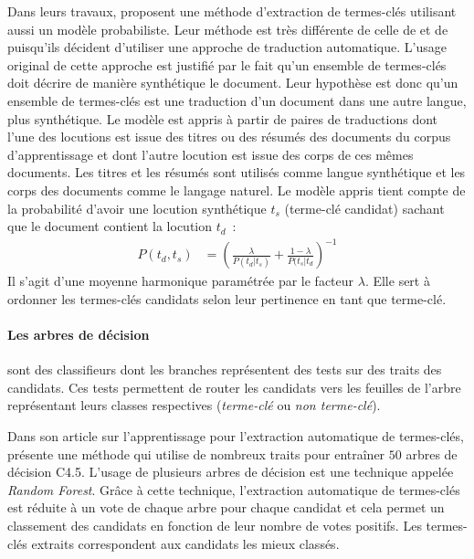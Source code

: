          Dans leurs travaux,  proposent une méthode
          d'extraction de termes-clés utilisant aussi un modèle probabiliste.
          Leur méthode est très différente de celle de  et
          de  puisqu'ils décident d'utiliser une
          approche de traduction automatique. L'usage original de cette approche
          est justifié par le fait qu'un ensemble de termes-clés doit décrire de
          manière synthétique le document. Leur hypothèse est donc qu'un
          ensemble de termes-clés est une traduction d'un document dans une
          autre langue, plus synthétique. Le modèle est appris à partir de
          paires de traductions dont l'une des locutions est issue des titres ou
          des résumés des documents du corpus d'apprentissage et dont l'autre
          locution est issue des corps de ces mêmes documents. Les titres et les
          résumés sont utilisés comme langue synthétique et les corps des
          documents comme le langage naturel. Le modèle appris tient compte de
          la probabilité d'avoir une locution synthétique $t_s$ (terme-clé
          candidat) sachant que le document contient la locution $t_d$~:
            \begin{align}
              P(t_d, t_s) &= \left(\frac{\lambda}{P(t_d | t_s)} + \frac{1 - \lambda}{P(t_s | t_d}\right)^{-1}
            \end{align}
          Il s'agit d'une moyenne harmonique paramétrée par le facteur
          $\lambda$. Elle sert à ordonner les termes-clés candidats selon leur
          pertinence en tant que terme-clé.

        \paragraph{Les arbres de décision}
          sont des classifieurs dont les branches représentent des tests sur des
          traits des candidats. Ces tests permettent de router les candidats
          vers les feuilles de l'arbre représentant leurs classes respectives
          (\textit{terme-clé} ou \textit{non terme-clé}).

          Dans son article sur l'apprentissage pour l'extraction automatique de
          termes-clés,  présente une méthode
          qui utilise de nombreux traits pour entraîner $50$ arbres de décision
          C4.5. L'usage de plusieurs arbres de décision est une technique
          appelée \textit{Random Forest}. Grâce à cette technique, l'extraction
          automatique de termes-clés est réduite à un vote de chaque arbre pour
          chaque candidat et cela permet un classement des candidats en fonction
          de leur nombre de votes positifs. Les termes-clés extraits
          correspondent aux candidats les mieux classés.

